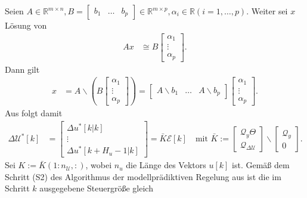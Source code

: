 \begin{remark}
Seien $A\in\mathbb{R}^{m\times n}, B=\begin{bmatrix} b_1 & \ldots & b_p \end{bmatrix}\in\mathbb{R}^{m\times p},\alpha_i\in\mathbb{R} (i=1,\ldots,p)$. Weiter sei $x$ Lösung von
\begin{align*}
	A x & \cong B\begin{bmatrix}
	\alpha_1\\ \vdots\\ \alpha_p
	\end{bmatrix}.
\end{align*}
Dann gilt
\begin{align}
	x & = A\backslash(B\begin{bmatrix}
	\alpha_1 \\ \vdots\\ \alpha_p
	\end{bmatrix})= \begin{bmatrix}
	A\backslash b_1 & \ldots & A\backslash b_p
	\end{bmatrix}\begin{bmatrix}
	\alpha_1 \\ \vdots\\ \alpha_p
	\end{bmatrix}.\label{eqn:kap_4_berechnung_x}
\end{align}
Aus  folgt damit
\begin{align*}
	\Delta\mathcal{U}^{\ast}[k] & = \begin{bmatrix}
	\Delta u^{\ast}[k|k]\\ \vdots\\ \Delta u^{\ast}[k+H_u-1|k]
	\end{bmatrix}=\bar{K}\mathcal{E}[k]\quad\text{mit }\bar{K}:=\begin{bmatrix}
	\mathcal{Q}_y\Theta\\ \mathcal{Q}_{\Delta\mathcal{U}}
	\end{bmatrix}\backslash\begin{bmatrix}
	\mathcal{Q}_y\\ 0
	\end{bmatrix}.
\end{align*}
Sei $K:=\bar{K}(1:n_{\mathcal{U}},:)$, wobei $n_{u}$ die Länge des Vektors $u[k]$ ist. Gemäß dem Schritt (S2) des Algorithmus der modellprädiktiven Regelung aus
 ist die im Schritt $k$ ausgegebene Steuergröße gleich
\begin{align*}

\end{align*}
\end{remark}
